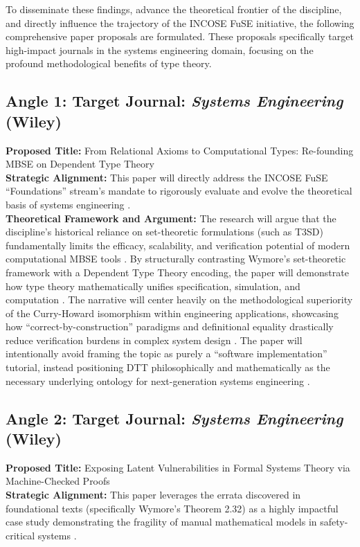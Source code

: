 \documentclass[11pt]{article}
\begin{document}
To disseminate these findings, advance the theoretical frontier of the discipline, and directly influence the trajectory of the INCOSE FuSE initiative, the following comprehensive paper proposals are formulated. These proposals specifically target high-impact journals in the systems engineering domain, focusing on the profound methodological benefits of type theory.

\subsection{Angle 1: Target Journal: \textit{Systems Engineering} (Wiley)}
\noindent \textbf{Proposed Title:} From Relational Axioms to Computational Types: Re-founding MBSE on Dependent Type Theory\\
\textbf{Strategic Alignment:} This paper will directly address the INCOSE FuSE ``Foundations'' stream's mandate to rigorously evaluate and evolve the theoretical basis of systems engineering \parencite{Ref3, Ref8, Ref66}.\\
\textbf{Theoretical Framework and Argument:} The research will argue that the discipline's historical reliance on set-theoretic formulations (such as T3SD) fundamentally limits the efficacy, scalability, and verification potential of modern computational MBSE tools \parencite{Ref1, Ref8}. By structurally contrasting Wymore's set-theoretic framework with a Dependent Type Theory encoding, the paper will demonstrate how type theory mathematically unifies specification, simulation, and computation \parencite{Ref22}. The narrative will center heavily on the methodological superiority of the Curry-Howard isomorphism within engineering applications, showcasing how ``correct-by-construction'' paradigms and definitional equality drastically reduce verification burdens in complex system design \parencite{Ref6, Ref25, Ref39}. The paper will intentionally avoid framing the topic as purely a ``software implementation'' tutorial, instead positioning DTT philosophically and mathematically as the necessary underlying ontology for next-generation systems engineering \parencite{Ref1, Ref66}.\subsection{Angle 2: Target Journal: \textit{Systems Engineering} (Wiley)}
\noindent \textbf{Proposed Title:} Exposing Latent Vulnerabilities in Formal Systems Theory via Machine-Checked Proofs\\
\textbf{Strategic Alignment:} This paper leverages the errata discovered in foundational texts (specifically Wymore's Theorem 2.32) as a highly impactful case study demonstrating the fragility of manual mathematical models in safety-critical systems \parencite{Ref7, Ref27}.\\
\end{document}
